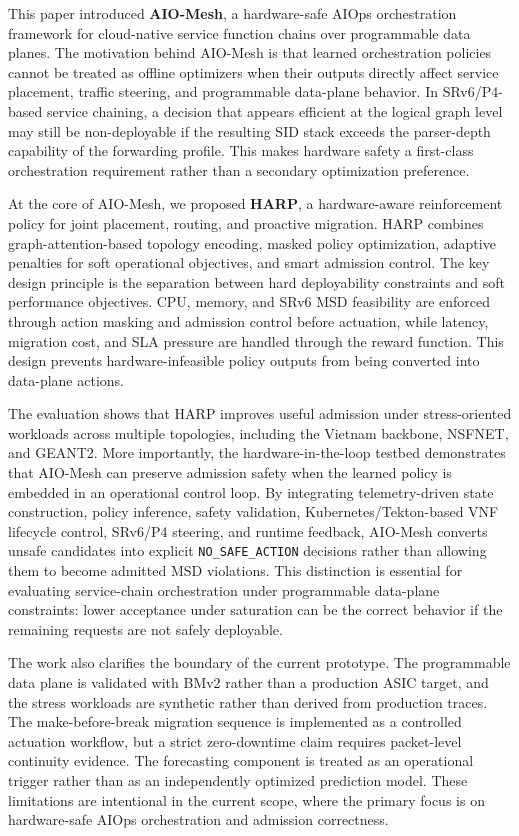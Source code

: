 \documentclass[final,5p]{elsarticle}
\begin{document}
This paper introduced \textbf{AIO-Mesh}, a hardware-safe AIOps orchestration framework for cloud-native service function chains over programmable data planes. The motivation behind AIO-Mesh is that learned orchestration policies cannot be treated as offline optimizers when their outputs directly affect service placement, traffic steering, and programmable data-plane behavior. In SRv6/P4-based service chaining, a decision that appears efficient at the logical graph level may still be non-deployable if the resulting SID stack exceeds the parser-depth capability of the forwarding profile. This makes hardware safety a first-class orchestration requirement rather than a secondary optimization preference.

At the core of AIO-Mesh, we proposed \textbf{HARP}, a hardware-aware reinforcement policy for joint placement, routing, and proactive migration. HARP combines graph-attention-based topology encoding, masked policy optimization, adaptive penalties for soft operational objectives, and smart admission control. The key design principle is the separation between hard deployability constraints and soft performance objectives. CPU, memory, and SRv6 MSD feasibility are enforced through action masking and admission control before actuation, while latency, migration cost, and SLA pressure are handled through the reward function. This design prevents hardware-infeasible policy outputs from being converted into data-plane actions.

The evaluation shows that HARP improves useful admission under stress-oriented workloads across multiple topologies, including the Vietnam backbone, NSFNET, and GEANT2. More importantly, the hardware-in-the-loop testbed demonstrates that AIO-Mesh can preserve admission safety when the learned policy is embedded in an operational control loop. By integrating telemetry-driven state construction, policy inference, safety validation, Kubernetes/Tekton-based VNF lifecycle control, SRv6/P4 steering, and runtime feedback, AIO-Mesh converts unsafe candidates into explicit \texttt{NO\_SAFE\_ACTION} decisions rather than allowing them to become admitted MSD violations. This distinction is essential for evaluating service-chain orchestration under programmable data-plane constraints: lower acceptance under saturation can be the correct behavior if the remaining requests are not safely deployable.

The work also clarifies the boundary of the current prototype. The programmable data plane is validated with BMv2 rather than a production ASIC target, and the stress workloads are synthetic rather than derived from production traces. The make-before-break migration sequence is implemented as a controlled actuation workflow, but a strict zero-downtime claim requires packet-level continuity evidence. The forecasting component is treated as an operational trigger rather than as an independently optimized prediction model. These limitations are intentional in the current scope, where the primary focus is on hardware-safe AIOps orchestration and admission correctness.
\end{document}
